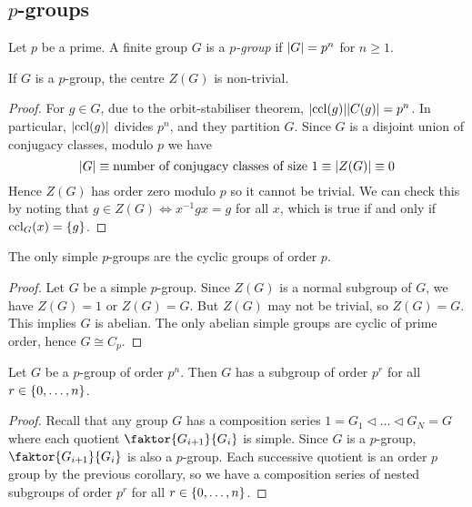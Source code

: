 \subsection{\( p \)-groups}
\begin{definition}
	Let \( p \) be a prime.
	A finite group \( G \) is a \textit{\( p \)-group} if \( \abs{G} = p^n \) for \( n \geq 1 \).
\end{definition}
\begin{theorem}
	If \( G \) is a \( p \)-group, the centre \( Z(G) \) is non-trivial.
\end{theorem}
\begin{proof}
	For \( g \in G \), due to the orbit-stabiliser theorem, \( \abs{\operatorname{ccl}(g)} \abs{C(g)} = p^n \).
	In particular, \( \abs{\operatorname{ccl}(g)} \) divides \( p^n \), and they partition \( G \).
	Since \( G \) is a disjoint union of conjugacy classes, modulo \( p \) we have
	\[ \abs{G} \equiv \text{number of conjugacy classes of size } 1 \equiv \abs{Z(G)} \equiv 0 \]
	Hence \( Z(G) \) has order zero modulo \( p \) so it cannot be trivial.
	We can check this by noting that \( g \in Z(G) \iff x^{-1} g x = g \) for all \( x \), which is true if and only if \( \operatorname{ccl}_G(x) = \qty{g} \).
\end{proof}
\begin{corollary}
	The only simple \( p \)-groups are the cyclic groups of order \( p \).
\end{corollary}
\begin{proof}
	Let \( G \) be a simple \( p \)-group.
	Since \( Z(G) \) is a normal subgroup of \( G \), we have \( Z(G) = 1 \) or \( Z(G) = G \).
	But \( Z(G) \) may not be trivial, so \( Z(G) = G \).
	This implies \( G \) is abelian.
	The only abelian simple groups are cyclic of prime order, hence \( G \cong C_p \).
\end{proof}
\begin{corollary}
	Let \( G \) be a \( p \)-group of order \( p^n \).
	Then \( G \) has a subgroup of order \( p^r \) for all \( r \in \qty{0, \dots, n} \).
\end{corollary}
\begin{proof}
	Recall that any group \( G \) has a composition series \( 1 = G_1 \triangleleft \dots \triangleleft G_N = G \) where each quotient \( \faktor{G_{i+1}}{G_i} \) is simple.
	Since \( G \) is a \( p \)-group, \( \faktor{G_{i+1}}{G_i} \) is also a \( p \)-group.
	Each successive quotient is an order \( p \) group by the previous corollary, so we have a composition series of nested subgroups of order \( p^r \) for all \( r \in \qty{0, \dots, n} \).
\end{proof}
